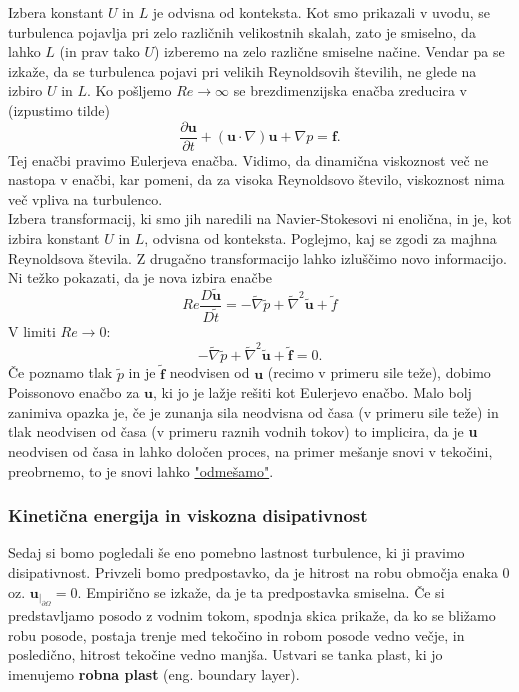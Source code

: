 \documentclass[mat2, tisk]{fmfdelo}
\newcommand{\bd}{\textbf}
\begin{document}
Izbera konstant $U$ in $L$ je odvisna od konteksta. Kot smo prikazali v uvodu, 
se turbulenca pojavlja pri zelo različnih velikostnih skalah, zato je smiselno, da 
lahko $L$ (in prav tako $U$) izberemo na zelo različne smiselne načine. Vendar pa se izkaže, da se 
turbulenca pojavi pri velikih Reynoldsovih številih, ne glede na izbiro $U$ in $L$.
Ko pošljemo $Re \rightarrow \infty$ se brezdimenzijska enačba zreducira v (izpustimo tilde)
\begin{equation}
\label{Euler NS}
\frac{\partial \bd{u}}{\partial t} + (\bd{u}\cdot \nabla)\bd{u} + \nabla p = \bd{f}.
\end{equation}
Tej enačbi pravimo Eulerjeva enačba. Vidimo, da dinamična viskoznost več 
ne nastopa v enačbi, kar pomeni, da za visoka Reynoldsovo število, viskoznost nima več vpliva na turbulenco. \\

Izbera transformacij, ki smo jih naredili na Navier-Stokesovi ni enolična, in je, kot 
izbira konstant $U$ in $L$, odvisna od konteksta. Poglejmo, kaj se zgodi za majhna 
Reynoldsova števila. Z drugačno transformacijo lahko izluščimo novo informacijo. Ni težko pokazati, da je nova izbira enačbe 
\begin{equation}
Re\frac{D\tilde{\bd{u}}}{D \tilde{t}} =  - \tilde{\nabla} \tilde{p}
+ \tilde{\nabla}^2 \tilde{\bd{u}} + \tilde{f}
\end{equation}
V limiti $Re \rightarrow 0$:
$$
- \tilde{\nabla} \tilde{p}+ \tilde{\nabla}^2 \tilde{\bd{u}} + \tilde{\bd{f}} = 0.
$$
Če poznamo tlak $\tilde{p}$ in je $\tilde{\bd{f}}$ neodvisen od 
$\bd{u}$ (recimo v primeru sile teže), dobimo Poissonovo enačbo za 
$\bd{u}$, ki jo je lažje rešiti kot Eulerjevo enačbo. Malo bolj zanimiva opazka je, če je zunanja sila neodvisna od časa (v primeru sile teže) in tlak neodvisen od časa (v primeru raznih vodnih tokov) to implicira, da je \bd{u} neodvisen od časa in lahko določen proces, na primer mešanje snovi v tekočini, preobrnemo, to je snovi 
lahko \href{https://www.youtube.com/watch?v=h1DnrWEOWeg&feature=youtu.be}{"odmešamo"}.  

\subsubsection{Kinetična energija in viskozna disipativnost}

Sedaj si bomo pogledali še eno pomebno lastnost turbulence, ki ji pravimo disipativnost. 
Privzeli bomo predpostavko, da je hitrost na robu območja enaka $0$ oz. $\bd{u}_{|_{\partial\Omega}} = 0$. 
Empirično se izkaže, da je ta predpostavka smiselna. Če si predstavljamo posodo z 
vodnim tokom, spodnja skica prikaže, da ko se bližamo robu posode, postaja trenje med tekočino
in robom posode vedno večje, in posledično, hitrost tekočine vedno manjša. Ustvari se tanka plast, 
ki jo imenujemo \textbf{robna plast} (eng. boundary layer). 
\end{document}
